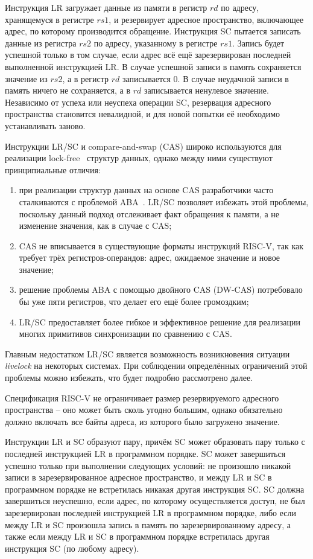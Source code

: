 Инструкция LR загружает данные из памяти в регистр $rd$ по адресу,
хранящемуся в регистре $rs1$, и резервирует адресное пространство,
включающее адрес, по которому производится обращение. Инструкция SC
пытается записать данные из регистра $rs2$ по адресу, указанному в
регистре $rs1$. Запись будет успешной только в том случае, если адрес
всё ещё зарезервирован последней выполненной инструкцией LR. В случае
успешной записи в память сохраняется значение из $rs2$, а в регистр
$rd$ записывается 0. В случае неудачной записи в память ничего не
сохраняется, а в $rd$ записывается ненулевое значение. Независимо от
успеха или неуспеха операции SC, резервация адресного пространства
становится невалидной, и для новой попытки её необходимо устанавливать заново.

Инструкции LR/SC и compare-and-swap (CAS) широко используются для
реализации lock-free~\cite{lock-free} структур данных, однако между
ними существуют принципиальные отличия:
\begin{enumerate}
  \item при реализации структур данных на основе CAS разработчики
    часто сталкиваются с проблемой ABA~\cite{aba}. LR/SC позволяет
    избежать этой проблемы, поскольку данный подход отслеживает факт
    обращения к памяти, а не изменение значения, как в случае с CAS;
  \item CAS не вписывается в существующие форматы инструкций RISC-V,
    так как требует трёх регистров-операндов: адрес, ожидаемое
    значение и новое значение;
  \item решение проблемы ABA с помощью двойного CAS (DW-CAS)
    потребовало бы уже пяти регистров, что делает его ещё более громоздким;
  \item LR/SC предоставляет более гибкое и эффективное решение для
    реализации многих примитивов синхронизации по сравнению с CAS.
\end{enumerate}

Главным недостатком LR/SC является возможность возникновения ситуации
\textit{livelock} на некоторых системах. При соблюдении определённых
ограничений этой проблемы можно избежать, что будет подробно рассмотрено далее.

Спецификация RISC-V не ограничивает размер резервируемого адресного
пространства -- оно может быть сколь угодно большим, однако
обязательно должно включать все байты адреса, из которого было
загружено значение.

Инструкции LR и SC образуют пару, причём SC может образовать пару
только с последней инструкцией LR в программном порядке. SC может
завершиться успешно только при выполнении следующих условий: не
произошло никакой записи в зарезервированное адресное пространство, и
между LR и SC в программном порядке не встретилась никакая другая
инструкция SC. SC должна завершиться неуспешно, если адрес, по
которому осуществляется доступ, не был зарезервирован последней
инструкцией LR в программном порядке, либо если между LR и SC
произошла запись в память по зарезервированному адресу, а также если
между LR и SC в программном порядке встретилась другая инструкция SC
(по любому адресу).

